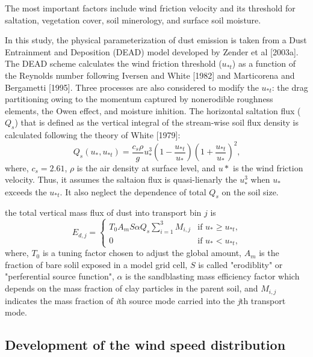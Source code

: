   The most important factors include wind friction velocity and its threshold for 
  saltation, vegetation cover, soil minerology, and surface soil moisture. 

  In this study, the physical parameterization of dust emission is taken from a Dust 
  Entrainment and Deposition (DEAD) model developed by Zender et al [2003a]. The DEAD scheme
  calculates the wind friction threshold ($u_{*t}$) as a function of the Reynolds number 
  following Iversen and White [1982] and Marticorena and Bergametti [1995]. Three processes 
  are also considered to modify the $u_{*t}$: the drag partitioning owing to the momentum 
  captured by nonerodible roughness elements, the Owen effect, and moisture inhition. The 
  horizontal saltation flux ($Q_s$) that is defined as the vertical integral of the 
  stream-wise soil flux density is calculated following the theory of White [1979]:
  \begin{equation}
  Q_s(u_*,u_{*t}) = \frac{c_s \rho}{g} u_*^3
        \left(1-\frac{u_{*t}}{u_*}\right)
        \left(1+\frac{u_{*t}}{u_*}\right)^2 \mbox{,}
  \end{equation}
  where, $c_s=2.61$, $\rho$ is the air density at surface level, and $u*$ is the wind 
  friction velocity. Thus, it assumes the saltaion flux is quasi-lienarly the $u_*^3$ when
  $u_*$ exceeds the $u_{*t}$. It also neglect the dependence of total $Q_s$ on the soil size. 

  the total
   vertical mass flux of dust into transport bin $j$ is
   \begin{equation} \label{eq:Ed}
   E_{d,j} = 
     \begin{cases} T_0 A_m S \alpha Q_s
                   \displaystyle \sum_{i=1}^3 M_{i,j} & \mbox{if $u_* \geq u_{*t}$,} \\
                   0 & \mbox{if $u_* < u_{*t}$,}
     \end{cases}
   \end{equation}
   where, $T_0$ is a tuning factor chosen to adjust the global amount, $A_m$ is the fraction
   of bare solil exposed in a model grid cell, $S$ is called "erodiblity" or "perferential 
   source function", $\alpha$ is the sandblasting mass efficiency factor which depends on the
   mass fraction of clay particles in the parent soil, and $M_{i,j}$ indicates the mass 
   fraction of \textit{i}th source mode carried into the \textit{j}th transport mode.

\subsection{Development of the wind speed distribution}

